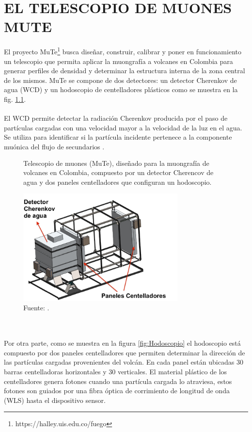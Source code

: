 \chapter{EL TELESCOPIO DE MUONES MUTE}
\label{Cap:MuTe}
El proyecto MuTe\footnote{https://halley.uis.edu.co/fuego} busca diseñar, construir, calibrar y poner en funcionamiento un telescopio que permita aplicar la muongrafía a volcanes en Colombia para generar perfiles de densidad y determinar la estructura interna de la zona central de los mismos. MuTe se compone de dos detectores: un detector Cherenkov de agua (WCD) y un hodoscopio de centelladores plásticos como se muestra en la fig. \ref{fig:MuTe}.\\ \\
El WCD permite detectar la radiación Cherenkov producida por el paso de partículas cargadas con una velocidad mayor a la velocidad de la luz en el agua. Se utiliza para identificar si la partícula incidente pertenece a la componente muónica del flujo de secundarios \citep{Tesis_adriana}.
\begin{figure}[h!]
\begin{centering}
  \caption{Telescopio de muones (MuTe), diseñado para la muongrafía de volcanes en Colombia, compuesto por un detector Cherencov de agua y dos paneles centelladores que configuran un hodoscopio.}
    \includegraphics[width=0.75\textwidth]{Images/Mute.JPG}
    \caption*{Fuente: \citep{MuTe_mec}. }
  \label{fig:MuTe}
  \par\end{centering}
\end{figure}
\\ \\
Por otra parte, como se muestra en la figura \ref{fig:Hodoscopio} el hodoscopio está compuesto por dos paneles centelladores que permiten determinar la dirección de las partículas cargadas provenientes del volcán. En cada panel están ubicadas 30 barras centelladoras horizontales y 30 verticales. El material plástico de los centelladores genera fotones  cuando una partícula cargada lo atraviesa, estos fotones son guiados por una fibra óptica de corrimiento de longitud de onda (WLS) hasta el dispositivo sensor.    

